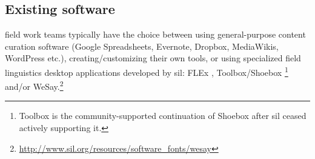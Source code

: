 \documentclass[11pt]{article}
\newcommand{\smalltodo}[2][]
    {\todo[caption={#2}, #1]
    {\tiny#2\normalsize}}
\begin{document}



\subsection{Existing software}
\label{sec:existing-software}

field work teams typically have the choice between using general-purpose content
curation software (Google Spreadsheets, Evernote, Dropbox, MediaWikis,
WordPress etc.), creating/customizing their own tools, or using specialized
field linguistics desktop applications developed by \gls{sil}:  FLEx
\cite{sil-flex}, Toolbox/Shoebox%
\footnote{Toolbox is the community-supported continuation of Shoebox after
    \gls{sil} ceased actively supporting it.} %
\cite{sil-toolbox-info} and/or WeSay.\footnote{\url{http://www.sil.org/resources/software\_fonts/wesay}}
\end{document}
